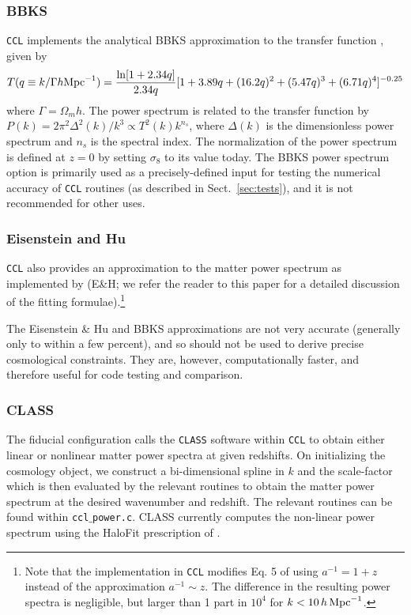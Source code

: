 \documentclass[\docopts]{\docclass}
\newcommand{\ccl}{{\tt CCL}\xspace}
\begin{document}
\subsubsection{BBKS}
\ccl implements the analytical BBKS approximation to the transfer function \citep{BBKS}, given by
\begin{equation}
T(q\equiv k/\Gamma h {\rm Mpc}^{-1}) = \frac{\ln[1+2.34q]}{2.34q}[1+3.89q+(16.2q)^2+(5.47q)^3+(6.71q)^4]^{-0.25}
\end{equation}
where $\Gamma = \Omega_m h$.
The power spectrum is related to the transfer function by 
$P(k) = 2 \pi^2 \Delta^2(k) /k^3  \propto T^2(k) k^{n_s}$, where $\Delta(k)$ is the dimensionless power 
spectrum and $n_s$ is the spectral index. The normalization of the power spectrum is defined at $z=0$ by 
setting $\sigma_8$ to its value today.
The BBKS power spectrum option is primarily used as a precisely-defined input for testing the numerical accuracy of \ccl routines (as described in Sect.~\ref{sec:tests}), and it is not recommended for other uses.

\subsubsection{Eisenstein and Hu}
\ccl also provides an approximation to the matter power spectrum as implemented by \citet{1998ApJ...496..605E} (E\&H; we refer the reader to this paper for a detailed discussion of the fitting formulae).\footnote{Note that the implementation in \ccl modifies Eq. 5 of \citet{1998ApJ...496..605E} using $a^{-1}=1+z$ instead of the approximation $a^{-1}\sim z$. The difference in the resulting power spectra is negligible, but larger than 1 part in $10^4$ for $k<10\,h\,{\rm Mpc}^{-1}$.}

The Eisenstein \& Hu and BBKS approximations are not very accurate (generally only to within a few percent), and so should not be used to derive precise cosmological constraints. They are, however, computationally faster, and therefore useful for code testing and comparison.

\subsubsection{CLASS}
The fiducial configuration calls the {\tt CLASS} software \citep{class} within \ccl to obtain either linear or nonlinear matter power spectra at given redshifts. On initializing the cosmology object, we construct a bi-dimensional spline in $k$ and the scale-factor which is then evaluated by the relevant routines to obtain the matter power spectrum at the desired wavenumber and redshift. The relevant routines can be found within {\tt ccl$\_$power.c}. CLASS currently computes the non-linear power spectrum using the HaloFit prescription of \cite{CLASS_halofit}.
\end{document}
